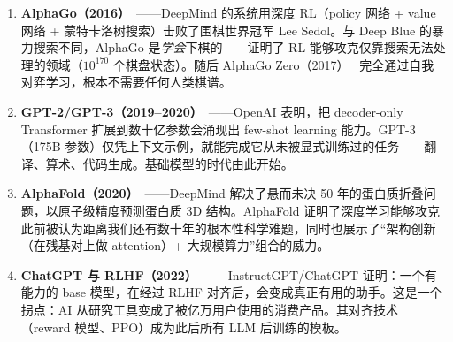 \documentclass[11pt,a4paper,openany]{book}
\begin{document}
\begin{enumerate}
  \item \textbf{AlphaGo（2016）}~\cite{silver2016mastering}——DeepMind 的系统用深度 RL（policy 网络 + value 网络 + 蒙特卡洛树搜索）击败了围棋世界冠军 Lee Sedol。与 Deep Blue 的暴力搜索不同，AlphaGo 是\emph{学会}下棋的——证明了 RL 能够攻克仅靠搜索无法处理的领域（$10^{170}$ 个棋盘状态）。随后 AlphaGo Zero（2017）~\cite{silver2017mastering} 完全通过自我对弈学习，根本不需要任何人类棋谱。
  \item \textbf{GPT-2/GPT-3（2019--2020）}~\cite{brown2020language}——OpenAI 表明，把 decoder-only Transformer 扩展到数十亿参数会涌现出 few-shot learning 能力。GPT-3（175B 参数）仅凭上下文示例，就能完成它从未被显式训练过的任务——翻译、算术、代码生成。基础模型的时代由此开始。
  \item \textbf{AlphaFold（2020）}~\cite{jumper2021alphafold}——DeepMind 解决了悬而未决 50 年的蛋白质折叠问题，以原子级精度预测蛋白质 3D 结构。AlphaFold 证明了深度学习能够攻克此前被认为距离我们还有数十年的根本性科学难题，同时也展示了“架构创新（在残基对上做 attention）+ 大规模算力”组合的威力。
  \item \textbf{ChatGPT 与 RLHF（2022）}~\cite{ouyang2022training}——InstructGPT/ChatGPT 证明：一个有能力的 base 模型，在经过 RLHF 对齐后，会变成真正有用的助手。这是一个拐点：AI 从研究工具变成了被亿万用户使用的消费产品。其对齐技术（reward 模型、PPO）成为此后所有 LLM 后训练的模板。

\end{enumerate}
\end{document}
